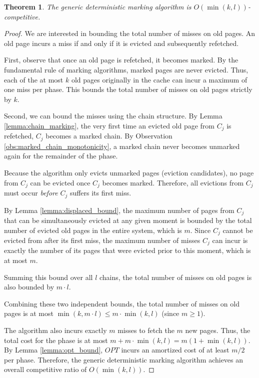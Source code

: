 \documentclass[a4paper]{article}
\newtheorem{theorem}{Theorem}    %
\begin{document}
\begin{theorem}
\label{thm:deterministic_O_min_k_l}
The generic deterministic marking algorithm is $O(\min(k,l))$-competitive.
\end{theorem}
\begin{proof}
We are interested in bounding the total number of misses on old pages. An old page incurs a miss if and only if it is evicted and subsequently refetched. 

First, observe that once an old page is refetched, it becomes marked. By the fundamental rule of marking algorithms, marked pages are never evicted. Thus, each of the at most $k$ old pages originally in the cache can incur a maximum of one miss per phase. This bounds the total number of misses on old pages strictly by $k$.

Second, we can bound the misses using the chain structure. By Lemma \ref{lemma:chain_marking}, the very first time an evicted old page from $C_j$ is refetched, $C_j$ becomes a marked chain. By Observation \ref{obs:marked_chain_monotonicity}, a marked chain never becomes unmarked again for the remainder of the phase. 

Because the algorithm only evicts unmarked pages (eviction candidates), no page from $C_j$ can be evicted once $C_j$ becomes marked. Therefore, all evictions from $C_j$ must occur \textit{before} $C_j$ suffers its first miss.

By Lemma \ref{lemma:displaced_bound}, the maximum number of pages from $C_j$ that can be simultaneously evicted at any given moment is bounded by the total number of evicted old pages in the entire system, which is $m$. Since $C_j$ cannot be evicted from after its first miss, the maximum number of misses $C_j$ can incur is exactly the number of its pages that were evicted prior to this moment, which is at most $m$.

Summing this bound over all $l$ chains, the total number of misses on old pages is also bounded by $m \cdot l$. 

Combining these two independent bounds, the total number of misses on old pages is at most $\min(k, m \cdot l) \le m \cdot \min(k, l)$ (since $m \ge 1$).

The algorithm also incurs exactly $m$ misses to fetch the $m$ new pages. Thus, the total cost for the phase is at most $m + m \cdot \min(k, l) = m(1 + \min(k, l))$. By Lemma \ref{lemma:opt_bound}, $OPT$ incurs an amortized cost of at least $m/2$ per phase. Therefore, the generic deterministic marking algorithm achieves an overall competitive ratio of $O(\min(k, l))$.
\end{proof}
\end{document}
